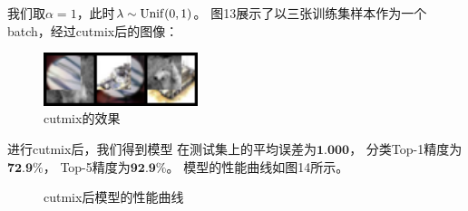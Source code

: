 \documentclass[UTF8]{ctexart}
\begin{document}
我们取$\alpha=1$，此时$\lambda\sim{\rm Unif}(0, 1)$。
图13展示了以三张训练集样本作为一个batch，经过cutmix后的图像：

\begin{figure}[htbp]
    \centering
    \includegraphics[width=0.40\textwidth]{../img/sample_cutmix.png}
    \caption{cutmix的效果}
\end{figure}

进行cutmix后，我们得到模型
在测试集上的平均误差为$\textbf{1.000}$，
分类Top-1精度为$\textbf{72.9\%}$，
Top-5精度为$\textbf{92.9\%}$。
模型的性能曲线如图14所示。

\begin{figure}[htbp]
    \centering
    \hspace{0.5in}
    \hspace{0.5in}
    \caption{cutmix后模型的性能曲线}
\end{figure}
\end{document}
